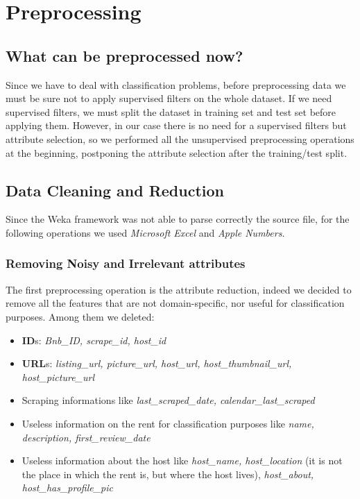 \section{Preprocessing}

\subsection{What can be preprocessed now?}
Since we have to deal with classification problems, before preprocessing data we must be sure not to apply supervised filters on the whole dataset. If we need supervised filters, we must split the dataset in training set and test set before applying them. However, in our case there is no need for a supervised filters but  attribute selection, so we performed all the unsupervised preprocessing operations at the beginning, postponing the attribute selection after the training/test split.

\subsection{Data Cleaning and Reduction}
Since the Weka framework was not able to parse correctly the source file, for the following operations we used \textit{Microsoft Excel} and \textit{Apple Numbers}.

\subsubsection{Removing Noisy and Irrelevant attributes}
The first preprocessing operation is the attribute reduction, indeed we decided to remove all the features that are not domain-specific, nor useful for classification purposes. Among them we deleted:

\begin{itemize}
	\item \textbf{ID}s: \textit{Bnb\_ID, scrape\_id, host\_id}
	\item \textbf{URL}s: \textit{listing\_url, picture\_url, host\_url, host\_thumbnail\_url, host\_picture\_url}
	\item Scraping informations like \textit{last\_scraped\_date, calendar\_last\_scraped}
	\item Useless information on the rent for classification purposes like \textit{name, description, first\_review\_date}
	\item Useless information about the host like \textit{host\_name, host\_location} (it is not the place in which the rent is, but where the host lives), \textit{host\_about, host\_has\_profile\_pic}
\end{itemize}

